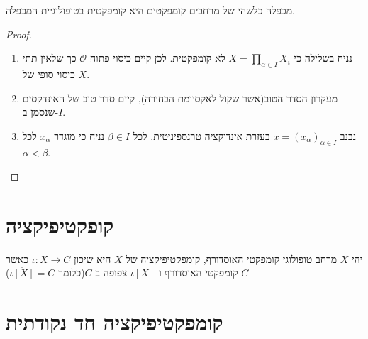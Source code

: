 \documentclass{tstextbook}
\begin{document}
\begin{theorem}[טיכונוף]
מכפלה כלשהי של מרחבים קומפקטים היא קומפקטית בטופולוגיית המכפלה.

\end{theorem}
\begin{proof}
  \begin{enumerate}
    \item נניח בשלילה כי \(X=\prod_{\alpha \in I} X_{i}\) לא קומפקטית. לכן קיים כיסוי פתוח \(\mathcal{O}\) כך שלאין תתי כיסוי סופי של \(X\). 


    \item מעקרון הסדר הטוב(אשר שקול לאקסיומת הבחירה), קיים סדר טוב של האינדקסים שנסמן ב-\(I\). 


    \item נבנב \(x=\left( x_{\alpha} \right)_{\alpha \in I}\) בעזרת אינדוקציה טרנספיניטית. לכל \(\beta \in I\) נניח כי מוגדר \(x_{\alpha}\) לכל \(\alpha<\beta\). 


  \end{enumerate}
\end{proof}
\section{קופקטיפיקציה}

\begin{definition}[קומפקטיפיקציה  ]
יהי \(X\) מרחב טופולוגי קומפקטי האוסדורף, קומפקטיפיקציה של \(X\) היא שיכון \(\iota:X\rightarrow C\) כאשר \(C\) קומפקטי האוסדורף ו-\(\iota[X]\) צפופה ב-\(C\)(כלומר \(\overline{\iota[X]}=C\))

\end{definition}
\section{קומפקטיפיקציה חד נקודתית}
\end{document}
